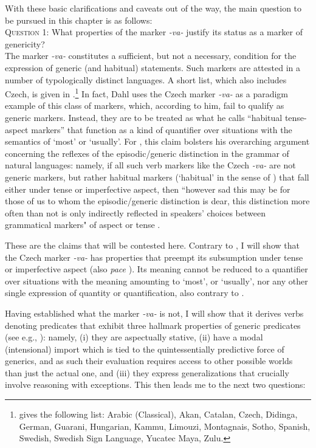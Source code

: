 \documentclass[output=paper,colorlinks,citecolor=brown]{langscibook}
\begin{document}
With these basic clarifications and caveats out of the way, the main question to be pursued in this chapter is as follows:\\

\noindent
\textsc{Question 1}:  What properties of the marker \textit{-va-} justify its status as a marker of genericity? \\

\noindent
The marker \textit{-va-}
constitutes a sufficient, but not a necessary, condition for the  expression of generic (and habitual) statements. Such markers
are attested in a number of typologically distinct languages. A short list, which also includes Czech, is 
given in \citet [421,~fn.~8]{dahl1995}.\footnote{\citet[421, fn.~8]{dahl1995} gives the following list:  
Arabic (Classical), Akan, Catalan, Czech, Didinga, German, Guarani, Hungarian, Kammu, Limouzi, Montagnais, Sotho, Spanish, Swedish, Swedish Sign Language, Yucatec Maya, Zulu.} In 
fact, Dahl 
uses the Czech marker \textit{-va-} as a paradigm example of this class of markers, which, according to him, fail to qualify as generic markers. Instead, they are to be treated as what he calls 
``habitual tense-aspect markers'' that function as a kind of quantifier over situations with the semantics of `most' or `usually'. 
For \citet{dahl1995}, this claim bolsters his overarching argument concerning the reflexes of the episodic/generic distinction in the grammar of natural languages: namely, if all such verb markers like the Czech \textit{-va-} are not generic markers, but rather habitual markers (`habitual' in the sense of \citealt{dahl1995}) that fall either under tense or imperfective aspect,
then ``however 
sad this may be for those of us to whom the episodic/generic distinction is dear, this distinction more often than not is only indirectly reflected in speakers' choices between grammatical markers" of aspect or tense \citep[425]{dahl1995}.

These are the claims that will be contested here.
Contrary to \citet{dahl1995}, I will show that the Czech marker \textit{-va-} 
has properties that preempt its subsumption under 
tense or imperfective aspect (also \textit{pace} \citealt{cable2022}).
Its  meaning
cannot be reduced to a quantifier over situations with 
the meaning amounting to `most', or `usually', 
nor any other single expression of quantity or quantification,
also contrary to \citet{dahl1995}.

Having established what the marker \textit{-va-} is not, I will show that it derives
verbs denoting predicates that 
exhibit three hallmark properties of 
generic predicates (see e.g., \citealt{carlson1977unified,krifka1995genericity}): namely, 
(i) they are aspectually stative,
(ii) have a modal (intensional) import which is tied to the quintessentially predictive force of generics, and as such their evaluation requires access to other possible worlds than just the actual one, 
and (iii) they express generalizations that crucially involve reasoning with exceptions.
This then leads me to the next two questions:\\
\end{document}
